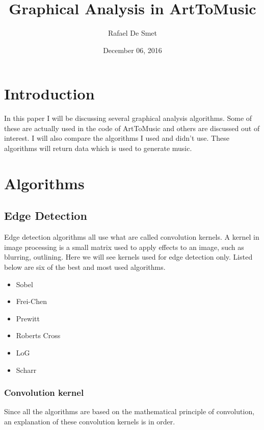\documentclass[12pt]{article}
\begin{document}
\title{Graphical Analysis in ArtToMusic}
\date{December 06, 2016}
\author{Rafael De Smet}

\maketitle
\tableofcontents
\newpage
\section{Introduction}

In this paper I will be discussing several graphical analysis algorithms. Some of these are actually used in the code of ArtToMusic and others are discussed out of interest. I will also compare the algorithms I used and didn't use. These algorithms will return data which is used to generate music.

\section{Algorithms}

\subsection{Edge Detection}

Edge detection algorithms all use what are called convolution kernels. A kernel in image processing is a small matrix used to apply effects to an image, such as blurring, outlining. Here we will see kernels used for edge detection only. Listed below are six of the best and most used algorithms.

\begin{itemize}
        \item Sobel 
        \item Frei-Chen
        \item Prewitt
        \item Roberts Cross
        \item LoG
        \item Scharr
\end{itemize}

\subsubsection{Convolution kernel}

Since all the algorithms are based on the mathematical principle of convolution, an explanation of these convolution kernels is in order. 
\newline
\end{document}
